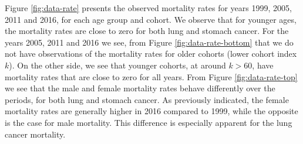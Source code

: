 \newpar Figure \ref{fig:data-rate} presents the observed mortality rates for years 1999, 2005, 2011 and 2016, for each age group and cohort. We observe that for younger ages, the mortality rates are close to zero for both lung and stomach cancer. For the years 2005, 2011 and 2016 we see, from Figure \ref{fig:data-rate-bottom} that we do not have observations of the  mortality rates for older cohorts (lower cohort index $k$). On the other side, we see that younger cohorts, at around $k > 60$, have mortality rates that are close to zero for all years. From Figure \ref{fig:data-rate-top} we see that the male and female mortality rates behave differently over the periods, for both lung and stomach cancer. As previously indicated, the female mortality rates are generally higher in 2016 compared to 1999, while the opposite is the case for male mortality. This difference is especially apparent for the lung cancer mortality. 

